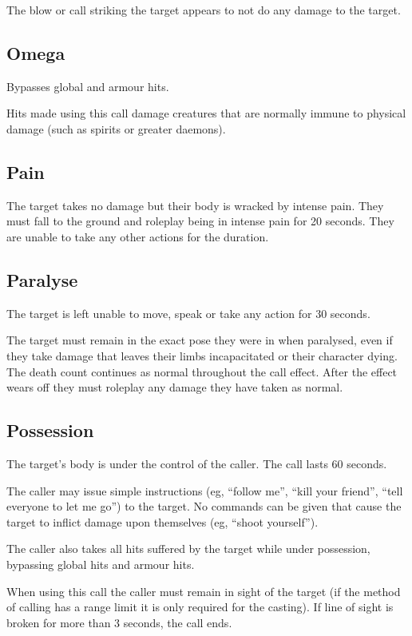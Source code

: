 \documentclass{scrbook}
\begin{document}
The blow or call striking the target appears to not do any damage to the target.

\subsection{Omega}

Bypasses global and armour hits.

Hits made using this call damage creatures that are normally immune to physical damage (such as spirits or greater daemons).

\subsection{Pain}

The target takes no damage but their body is wracked by intense pain. They must fall to the ground and roleplay being in intense pain for 20 seconds. They are unable to take any other actions for the duration.

\subsection{Paralyse}

The target is left unable to move, speak or take any action for 30 seconds.

The target must remain in the exact pose they were in when paralysed, even if they take damage that leaves their limbs incapacitated or their character dying. The death count continues as normal throughout the call effect. After the effect wears off they must roleplay any damage they have taken as normal.

\subsection{Possession}

The target's body is under the control of the caller. The call lasts 60 seconds.

The caller may issue simple instructions (eg, ``follow me'', ``kill your friend'', ``tell everyone to let me go'') to the target. No commands can be given that cause the target to inflict damage upon themselves (eg, ``shoot yourself'').

The caller also takes all hits suffered by the target while under possession, bypassing global hits and armour hits.

When using this call the caller must remain in sight of the target (if the method of calling has a range limit it is only required for the casting). If line of sight is broken for more than 3 seconds, the call ends.
\end{document}
